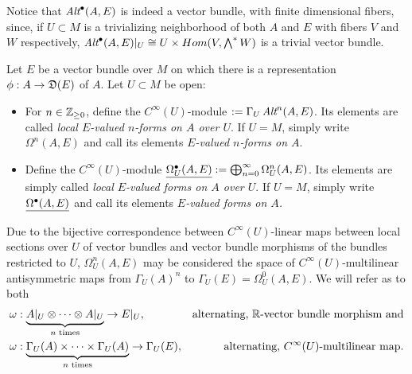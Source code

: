 Notice that $\operatorname{\textit{Alt}}^\bullet(A, E)$ is indeed a vector bundle, with finite dimensional fibers, since, if $U \subset M$ is a trivializing neighborhood of both $A$ and $E$ with fibers $V$ and $W$ respectively, $\operatorname{\textit{Alt}}^\bullet(A, E)|_U \cong U \times Hom(V, \bigwedge^* W)$ is a trivial vector bundle.

\begin{definition}
Let $E$ be a vector bundle over $M$ on which there is a representation $\phi: A \to \alg D(E)$ of $A$. Let $U \subset M$ be open:

    \begin{itemize}
    
    \item For $n \in \mathbb{Z}_{\geq 0}$, define the $C^\infty(U)$-module \emph{}$:= \Gamma_U\operatorname{\textit{Alt}}^n(A, E)$. Its elements are called \emph{local $E$-valued $n$-forms on $A$ over $U$}. If $U = M$, simply write \emph{$\Omega^n(A, E)$} and call its elements \emph{$E$-valued $n$-forms on $A$}.
    
    \item Define the $C^\infty(U)$-module $\emph{\Omega_U^\bullet(A, E)} := \bigoplus^\infty_{n = 0} \Omega_U^n(A, E)$. Its elements are simply called \emph{local $E$-valued forms on $A$ over $U$}. If $U = M$, simply write $\emph{\Omega^\bullet(A, E)}$ and call its elements \emph{$E$-valued forms on $A$.}
    
    
        
    \end{itemize}
    
\end{definition}

\begin{remark}\label{remarkFOrmsHave2Ways2FormsALternativeVersion}
Due to the bijective correspondence between $C^\infty(U)$-linear maps between local sections over $U$ of vector bundles and vector bundle morphisms of the bundles restricted to $U$, $\Omega_U^n(A, E)$ may be considered the space of $C^\infty(U)$-multilinear antisymmetric maps from $\Gamma_U(A)^n$ to $\Gamma_U(E) = \Omega_U^0(A, E)$. We will refer as  to both
\begin{align}
    \omega &: \underbrace{A|_U \otimes \cdots \otimes A|_U}_{\text{$n$ times}} \to E|_U, & \text{alternating, $\mathbb{R}$-vector bundle morphism and}\\
    \omega &: \underbrace{\Gamma_U(A) \times \cdots \times \Gamma_U(A)}_{\text{$n$ times}} \to \Gamma_U(E), & \text{alternating, $C^\infty(U)$-multilinear map}.
\end{align}
    
    
\end{remark}

